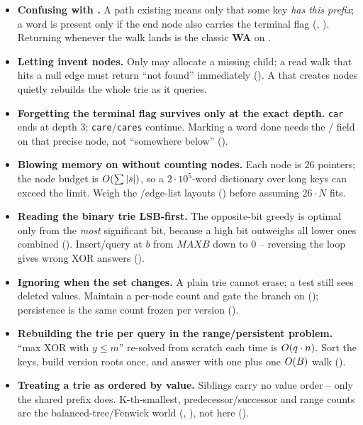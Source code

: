 \begin{itemize}[nosep, leftmargin=1.4em]
  \item \textbf{Confusing  with .} A path existing means only that some key
        \emph{has this prefix}; a word is present only if the end node also carries the terminal flag
        (, ). Returning  whenever the walk lands is the
        classic \textbf{WA} on .
  \item \textbf{Letting  invent nodes.} Only  may allocate a missing child; a
        read walk that hits a null edge must return ``not found'' immediately
        (). A  that creates nodes quietly rebuilds the whole trie as it
        queries.
  \item \textbf{Forgetting the terminal flag survives only at the exact depth.} \texttt{car} ends at depth
        $3$; \texttt{care}/\texttt{cares} continue. Marking a word done needs the /
        field on that precise node, not ``somewhere below'' ().
  \item \textbf{Blowing memory on  without counting nodes.} Each node is $26$ pointers;
        the node budget is $O(\sum|s|)$, so a $2\cdot10^{5}$-word dictionary over long keys can exceed
        the limit. Weigh the /edge-list layouts () before assuming
        $26\cdot N$ fits.
  \item \textbf{Reading the binary trie LSB-first.} The opposite-bit greedy is optimal only from the
        \emph{most} significant bit, because a high bit outweighs all lower ones combined
        (). Insert/query at $b$ from $\mathit{MAXB}$ down to $0$ -- reversing the
        loop gives wrong XOR answers ().
  \item \textbf{Ignoring  when the set changes.} A plain trie cannot erase; a
         test still sees deleted values. Maintain a per-node count and gate the
        branch on  (); persistence is the same count frozen per version
        ().
  \item \textbf{Rebuilding the trie per query in the range/persistent problem.} ``max XOR with $y \le m$''
        re-solved from scratch each time is $O(q\cdot n)$. Sort the keys, build version roots once,
        and answer with one  plus one $O(B)$ walk ().
  \item \textbf{Treating a trie as ordered by value.} Siblings carry no value order -- only the shared
        prefix does. K-th-smallest, predecessor/successor and range counts are the balanced-tree/Fenwick
        world (, ), not here ().
\end{itemize}

